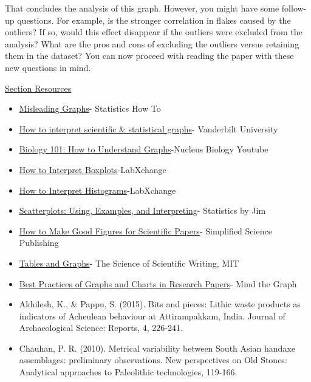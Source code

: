 \documentclass{article}
\begin{document}
That concludes the analysis of this graph. However, you might have some follow-up questions. For example, is the stronger correlation in flakes caused by the outliers? If so, would this effect disappear if the outliers were excluded from the analysis? What are the pros and cons of excluding the outliers versus retaining them in the dataset?
You can now proceed with reading the paper with these new questions in mind.

\underline{Section Resources}

\begin{itemize}
    \item \href{https://www.statisticshowto.com/probability-and-statistics/descriptive-statistics/misleading-graphs/}{Misleading Graphs}- Statistics How To
    \item \href{https://biostat.app.vumc.org/wiki/pub/Main/TheresaScott/Interpret.Graphs.TAScott.handout.pdf}{How to interpret scientific \& statistical graphs}- Vanderbilt University
    \item \href{https://www.youtube.com/watch?v=JXejcX1nQs4}{Biology 101: How to Understand Graphs}-Nucleus Biology Youtube
    \item \href{https://www.labxchange.org/library/items/lb:LabXchange:d8863c77:html:1}{How to Interpret Boxplots}-LabXchange
    \item \href{https://www.labxchange.org/library/items/lb:LabXchange:10d3270e:html:1}{How to Interpret Histograms}-LabXchange
    \item \href{https://statisticsbyjim.com/graphs/scatterplots/}{Scatterplots: Using, Examples, and Interpreting}- Statistics by Jim
    \item \href{https://www.simplifiedsciencepublishing.com/resources/how-to-make-good-figures-for-scientific-papers}{How to Make Good Figures for Scientific Papers}- Simplified Science Publishing
    \item \href{https://web.mit.edu/7.021/www/lectures/TablesGraphs_MO.pdf}{Tables and Graphs}- The Science of Scientific Writing, MIT
    \item \href{https://mindthegraph.com/blog/graphs-charts-tips-research-paper/}{Best Practices of Graphs and Charts in Research Papers}- Mind the Graph
    \item  \hypertarget{pappu}{Akhilesh, K., \& Pappu, S. (2015). Bits and pieces: Lithic waste products as indicators of Acheulean behaviour at Attirampakkam, India. Journal of Archaeological Science: Reports, 4, 226-241.}
    \item\hypertarget{chauhan}{Chauhan, P. R. (2010). Metrical variability between South Asian handaxe assemblages: preliminary observations. New perspectives on Old Stones: Analytical approaches to Paleolithic technologies, 119-166.}

\end{itemize}
\end{document}

